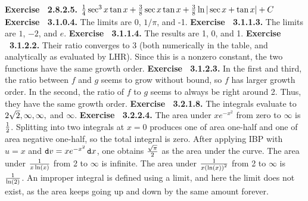  {\noindent \protect \bf  Exercise ~2.8.2.5.} $\protect \frac  {1}{4}\protect \qopname  \relax o{sec}^3{x}\protect \qopname  \relax o{tan}{x} +\protect \frac  {3}{8} \protect \qopname  \relax o{sec}{x}\protect \qopname  \relax o{tan}{x}+\protect \frac  {3}{8} \protect \qopname  \relax o{ln}{|\protect \qopname  \relax o{sec}{x}+\protect \qopname  \relax o{tan}{x}|}+C$ \protect \newline  \protect \newline  
 {\noindent \protect \bf  Exercise ~3.1.0.4.} The limits are 0, $1/\pi $, and -1.  \protect \newline  \protect \newline  
 {\noindent \protect \bf  Exercise ~3.1.1.3.} The limits are $1$, $-2$, and $e$.  \protect \newline  \protect \newline  
 {\noindent \protect \bf  Exercise ~3.1.1.4.} The results are 1, 0, and 1. \protect \newline  \protect \newline  
 {\noindent \protect \bf  Exercise ~3.1.2.2.} Their ratio converges to 3 (both numerically in the table, and analytically as evaluated by LHR). Since this is a nonzero constant, the two functions have the same growth order. \protect \newline  \protect \newline  
 {\noindent \protect \bf  Exercise ~3.1.2.3.} In the first and third, the ratio between $f$ and $g$ seems to grow without bound, so $f$ has larger growth order. In the second, the ratio of $f$ to $g$ seems to always be right around 2. Thus, they have the same growth order. \protect \newline  \protect \newline  
 {\noindent \protect \bf  Exercise ~3.2.1.8.} The integrals evaluate to $2\protect \sqrt  {2},\infty ,\infty ,$ and $\infty $. \protect \newline  \protect \newline  
 {\noindent \protect \bf  Exercise ~3.2.2.4.} \textbullet The area under $xe^{-x^2}$ from zero to $\infty $ is $\protect \frac  {1}{2}$. \textbullet Splitting into two integrals at $x=0$ produces one of area one-half and one of area negative one-half, so the total integral is zero. \textbullet After applying IBP with $u=x$ and $\mathop {}\protect \tmspace  -\thinmuskip {.1667em}\protect \mathtt  {d}v = xe^{-x^2}\mathop {}\protect \tmspace  -\thinmuskip {.1667em}\protect \mathtt  {d}x$, one obtains $\protect \frac  {\protect \sqrt  {\pi }}{2}$ as the area under the curve. \textbullet The area under $\protect \frac  {1}{x\protect \qopname  \relax o{ln}(x)}$ from 2 to $\infty $ is infinite. \textbullet The area under $\protect \frac  {1}{x\left (\protect \qopname  \relax o{ln}(x)\right )^2}$ from 2 to $\infty $ is $\protect \frac  {1}{\protect \qopname  \relax o{ln}(2)}$. \textbullet An improper integral is defined using a limit, and here the limit does not exist, as the area keeps going up and down by the same amount forever. \protect \newline  \protect \newline  
